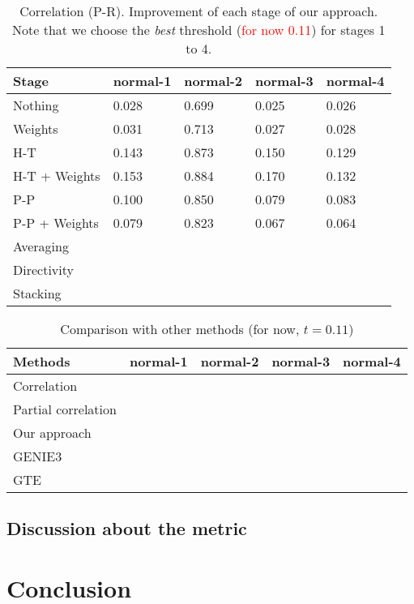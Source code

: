 \documentclass[wcp]{jmlr}
\begin{document}
\begin{table}[htb]
\centering
\caption{Correlation (P-R). Improvement of each stage of our approach. Note that we choose the
         \textit{best} threshold (\textcolor{red}{for now 0.11}) for stages 1 to 4.}
\begin{tabular}{*{5}{l}}
\toprule
Stage               & normal-1 & normal-2 & normal-3 & normal-4 \\
\midrule
Nothing             & 0.028 & 0.699 & 0.025 & 0.026\\
Weights             & 0.031 & 0.713 & 0.027 & 0.028\\
H-T                 & 0.143 & 0.873 & 0.150 & 0.129\\
H-T + Weights       & 0.153 & 0.884 & 0.170 & 0.132\\
P-P                 & 0.100 & 0.850 & 0.079 & 0.083\\
P-P + Weights       & 0.079 & 0.823 & 0.067 & 0.064\\
Averaging           & & & & \\
Directivity         & & & & \\
Stacking            & & & & \\
\bottomrule
\end{tabular}
\end{table}


\begin{table}[htb]
\centering
\caption{Comparison with other methods (for now, $t = 0.11$)}
\begin{tabular}{*{5}{l}}
\toprule
Methods             & normal-1 & normal-2 & normal-3 & normal-4 \\
\midrule
Correlation         & & & & \\
Partial correlation & & & & \\
Our approach        & & & & \\
GENIE3              & & & & \\
GTE                 & & & & \\
\bottomrule
\end{tabular}
\end{table}


\subsection{Discussion about the metric}
\label{sec:metric}


\section{Conclusion}
\end{document}
